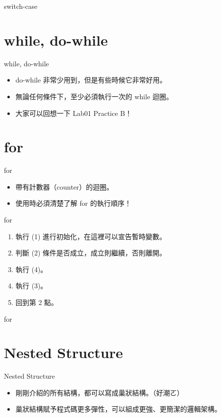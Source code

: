 \documentclass[t]{beamer}
\begin{document}
\begin{frame}{switch-case}
  
\end{frame}

\section{while, do-while}
\begin{frame}{while, do-while}
  \begin{itemize}
    \item do-while 非常少用到，但是有些時候它非常好用。
    \item 無論任何條件下，至少必須執行一次的 while 迴圈。
    \item 大家可以回想一下 Lab01 Practice B！
  \end{itemize}
\end{frame}

\section{for}
\begin{frame}{for}
  \begin{itemize}
    \item 帶有計數器（counter）的迴圈。
    \item 使用時必須清楚了解 for 的執行順序！
  \end{itemize}
\end{frame}

\begin{frame}{for}
  
  \begin{enumerate}
    \item 執行 (1) 進行初始化，在這裡可以宣告暫時變數。
    \item 判斷 (2) 條件是否成立，成立則繼續，否則離開。
    \item 執行 (4)。
    \item 執行 (3)。
    \item 回到第 2 點。
  \end{enumerate}
\end{frame}

\begin{frame}{for}
  
  
\end{frame}

\section{Nested Structure}
\begin{frame}{Nested Structure}
  \begin{itemize}
    \item 剛剛介紹的所有結構，都可以寫成巢狀結構。（好潮ㄛ）
    \item 巢狀結構賦予程式碼更多彈性，可以組成更強、更簡潔的邏輯架構。
    
  \end{itemize}
\end{frame}
\end{document}
